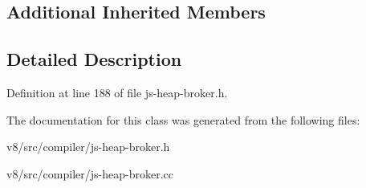 \subsection*{Additional Inherited Members}


\subsection{Detailed Description}


Definition at line 188 of file js-\/heap-\/broker.\+h.



The documentation for this class was generated from the following files\+:\begin{DoxyCompactItemize}
\item 
v8/src/compiler/js-\/heap-\/broker.\+h\item 
v8/src/compiler/js-\/heap-\/broker.\+cc\end{DoxyCompactItemize}
